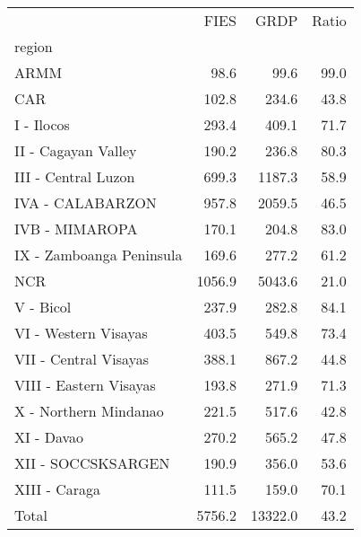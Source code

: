 \begin{tabular}{lrrr}
\toprule
{} &    FIES &     GRDP &  Ratio \\
region                   &         &          &        \\
\midrule
ARMM                     &    98.6 &     99.6 &   99.0 \\
CAR                      &   102.8 &    234.6 &   43.8 \\
I - Ilocos               &   293.4 &    409.1 &   71.7 \\
II - Cagayan Valley      &   190.2 &    236.8 &   80.3 \\
III - Central Luzon      &   699.3 &   1187.3 &   58.9 \\
IVA - CALABARZON         &   957.8 &   2059.5 &   46.5 \\
IVB - MIMAROPA           &   170.1 &    204.8 &   83.0 \\
IX - Zamboanga Peninsula &   169.6 &    277.2 &   61.2 \\
NCR                      &  1056.9 &   5043.6 &   21.0 \\
V - Bicol                &   237.9 &    282.8 &   84.1 \\
VI - Western Visayas     &   403.5 &    549.8 &   73.4 \\
VII - Central Visayas    &   388.1 &    867.2 &   44.8 \\
VIII - Eastern Visayas   &   193.8 &    271.9 &   71.3 \\
X - Northern Mindanao    &   221.5 &    517.6 &   42.8 \\
XI - Davao               &   270.2 &    565.2 &   47.8 \\
XII - SOCCSKSARGEN       &   190.9 &    356.0 &   53.6 \\
XIII - Caraga            &   111.5 &    159.0 &   70.1 \\
Total                    &  5756.2 &  13322.0 &   43.2 \\
\bottomrule
\end{tabular}
